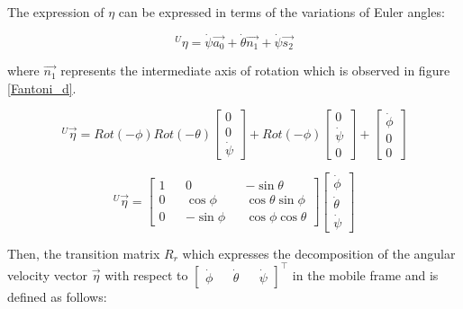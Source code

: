 \documentclass{thesisreport}
\begin{document}
The expression of $\eta$ can be expressed in terms of the variations of Euler angles:

\begin{equation*}
{}^{U}\eta = \dot{\psi} \overrightarrow{a_0} + \dot{\theta} \overrightarrow{n_1} + \dot{\psi} \overrightarrow{s_2}
\end{equation*}

where $\overrightarrow{n_1}$ represents the intermediate axis of rotation which is observed in figure \ref{Fantoni_d}.

\begin{equation*}
	{}^{U}\overrightarrow{\eta} = Rot(-\phi)Rot(-\theta)\begin{bmatrix}
	0 \\
	0 \\
	\dot{\psi}
	\end{bmatrix} + Rot(-\phi) \begin{bmatrix}
	0 \\
	\dot{\psi} \\
	0 
	\end{bmatrix} + \begin{bmatrix}
	\dot{\phi}\\
	0\\
	0
	\end{bmatrix}
\end{equation*}

\begin{equation}\label{eta_Euler_angles_equation}
	{}^{U}\overrightarrow{\eta} = \begin{bmatrix}
	1 && 0 && -\sin \theta \\
	0 && \cos \phi && \cos \theta \sin \phi \\
	0 && - \sin \phi && \cos \phi \cos \theta 
	\end{bmatrix}
	\begin{bmatrix}
	\dot{\phi}\\
	\dot{\theta}\\
	\dot{\psi}
	\end{bmatrix}
\end{equation}

Then, the transition matrix $R_r$ which expresses the decomposition of the angular velocity vector $\overrightarrow{\eta}$ with respect to $\begin{bmatrix}
\dot{\phi} && \dot{\theta} && \dot{\psi}
\end{bmatrix}^{\intercal}$ in the mobile frame \cite{Etkin1996} and \cite{Goldstein1980} is defined as follows:
\end{document}
